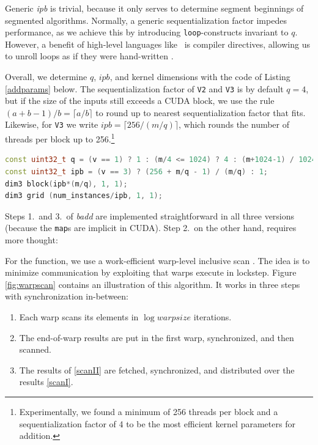 Generic \textit{ipb} is trivial, because it only serves to determine segment
beginnings of segmented algorithms. Normally, a generic sequentialization factor
impedes performance, as we achieve this by introducing \texttt{loop}-constructs
invariant to $q$. However, a benefit of high-level languages like \cpp\ is
compiler directives, allowing us to unroll loops as if they were hand-written
\cite{cudaguide}.

Overall, we determine $q$, $\mathit{ipb}$, and kernel dimensions with the code
of Listing \ref{addparams} below. The sequentialization factor of \texttt{V2}
and \texttt{V3} is by default $q=4$, but if the size of the inputs still exceeds
a CUDA block, we use the rule $(a + b - 1) / b = \lceil a / b \rceil$ to round up to
nearest sequentialization factor that fits. Likewise, for \texttt{V3} we write
$\mathit{ipb} = \lceil 256 / (m/q) \rceil$, which rounds the number of threads per block
up to 256.\footnote{Experimentally, we found a minimum of 256 threads per block
  and a sequentialization factor of 4 to be the most efficient kernel parameters
  for addition.}


\begin{lstlisting}[language=CPP,caption={\footnotesize CUDA addition parameters and kernel dimensions for version $v$ with size $m$ and $\mathit{num\_instances}$.},label={addparams}]
const uint32_t q = (v == 1) ? 1 : (m/4 <= 1024) ? 4 : (m+1024-1) / 1024;
const uint32_t ipb = (v == 3) ? (256 + m/q - 1) / (m/q) : 1;
dim3 block(ipb*(m/q), 1, 1);
dim3 grid (num_instances/ipb, 1, 1);
\end{lstlisting}

Steps 1.\ and 3.\ of \textit{badd} are implemented straightforward in all three
versions (because the \texttt{map}s are implicit in CUDA). Step 2.\ on the other
hand, requires more thought:

For the  function, we use a work-efficient warp-level inclusive scan
\cite{warpscan}. The idea is to minimize communication by exploiting that warps
execute in lockstep. Figure \ref{fig:warpscan} contains an illustration of this
algorithm. It works in three steps with synchronization in-between:
\begin{enumerate}[label=\Roman*]
\item Each warp scans its elements in $\log \mathit{warpsize}$ iterations.\label{scanI}
\item The end-of-warp results are put in the first warp, synchronized, and then
  scanned.\label{scanII}
\item The results of \ref{scanII} are fetched, synchronized, and distributed over the
  results \ref{scanI}.
\end{enumerate}

